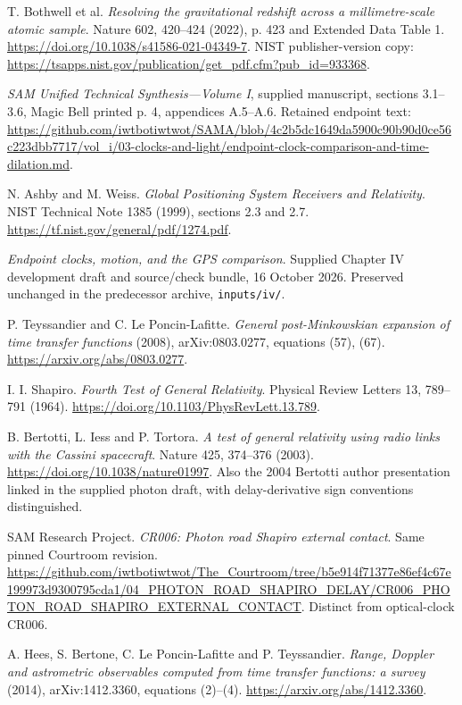 \documentclass[10pt,twocolumn,letterpaper]{article}
\begin{document}
\noindent[8] T. Bothwell et al. \emph{Resolving the gravitational redshift across a millimetre-scale atomic sample}. Nature 602, 420--424 (2022), p. 423 and Extended Data Table 1. \url{https://doi.org/10.1038/s41586-021-04349-7}. NIST publisher-version copy: \url{https://tsapps.nist.gov/publication/get_pdf.cfm?pub_id=933368}.

\noindent[9] \emph{SAM Unified Technical Synthesis---Volume I}, supplied manuscript, sections 3.1--3.6, Magic Bell printed p. 4, appendices A.5--A.6. Retained endpoint text: \url{https://github.com/iwtbotiwtwot/SAMA/blob/4c2b5dc1649da5900c90b90d0ce56c223dbb7717/vol_i/03-clocks-and-light/endpoint-clock-comparison-and-time-dilation.md}.

\noindent[10] N. Ashby and M. Weiss. \emph{Global Positioning System Receivers and Relativity}. NIST Technical Note 1385 (1999), sections 2.3 and 2.7. \url{https://tf.nist.gov/general/pdf/1274.pdf}.

\noindent[11] \emph{Endpoint clocks, motion, and the GPS comparison}. Supplied Chapter IV development draft and source/check bundle, 16 October 2026. Preserved unchanged in the predecessor archive, \texttt{inputs/iv/}.

\noindent[12] P. Teyssandier and C. Le Poncin-Lafitte. \emph{General post-Minkowskian expansion of time transfer functions} (2008), arXiv:0803.0277, equations (57), (67). \url{https://arxiv.org/abs/0803.0277}.

\noindent[13] I. I. Shapiro. \emph{Fourth Test of General Relativity}. Physical Review Letters 13, 789--791 (1964). \url{https://doi.org/10.1103/PhysRevLett.13.789}.

\noindent[14] B. Bertotti, L. Iess and P. Tortora. \emph{A test of general relativity using radio links with the Cassini spacecraft}. Nature 425, 374--376 (2003). \url{https://doi.org/10.1038/nature01997}. Also the 2004 Bertotti author presentation linked in the supplied photon draft, with delay-derivative sign conventions distinguished.

\noindent[15] SAM Research Project. \emph{CR006: Photon road Shapiro external contact}. Same pinned Courtroom revision. \url{https://github.com/iwtbotiwtwot/The_Courtroom/tree/b5e914f71377e86ef4c67e199973d9300795cda1/04_PHOTON_ROAD_SHAPIRO_DELAY/CR006_PHOTON_ROAD_SHAPIRO_EXTERNAL_CONTACT}. Distinct from optical-clock CR006.

\noindent[16] A. Hees, S. Bertone, C. Le Poncin-Lafitte and P. Teyssandier. \emph{Range, Doppler and astrometric observables computed from time transfer functions: a survey} (2014), arXiv:1412.3360, equations (2)--(4). \url{https://arxiv.org/abs/1412.3360}.
\end{document}
